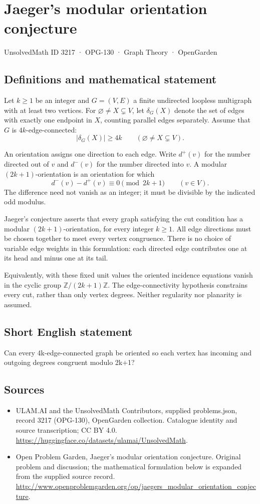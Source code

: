 \documentclass[11pt,a4paper]{article}
\begin{document}
\section*{Jaeger's modular orientation conjecture}\label{3217}
{\small UnsolvedMath ID 3217 · OPG-130 · Graph Theory · OpenGarden}
\subsection{Definitions and mathematical statement}
Let $k\geq1$ be an integer and
$G=(V,E)$ a finite undirected loopless
multigraph with at least two vertices.
For $\varnothing\neq X\subsetneq V$,
let $\delta_G(X)$ denote the set of
edges with exactly one endpoint in
$X$, counting parallel edges separately.
Assume that $G$ is $4k$-edge-connected:
\[
 |\delta_G(X)|\geq4k
 \qquad(\varnothing\neq X\subsetneq V).
\]

An orientation assigns one direction
to each edge. Write $d^+(v)$ for the
number directed out of $v$ and
$d^-(v)$ for the number directed
into $v$. A modular $(2k+1)$-orientation
is an orientation for which
\[
 d^-(v)-d^+(v)\equiv0\pmod{2k+1}
 \qquad(v\in V).
\]
The difference need not vanish as
an integer; it must be divisible
by the indicated odd modulus.

Jaeger's conjecture asserts that
every graph satisfying the cut
condition has a modular
$(2k+1)$-orientation, for every
integer $k\geq1$. All edge
directions must be chosen together
to meet every vertex congruence.
There is no choice of variable
edge weights in this formulation:
each directed edge contributes
one at its head and minus one
at its tail.

Equivalently, with these fixed
unit values the oriented incidence
equations vanish in the cyclic
group $\mathbb Z/(2k+1)\mathbb Z$.
The edge-connectivity hypothesis
constrains every cut, rather than
only vertex degrees. Neither
regularity nor planarity is assumed.
\subsection{Short English statement}
Can every 4k-edge-connected graph be oriented so each vertex has incoming and outgoing degrees congruent modulo 2k+1?
\subsection{Sources}
\begin{itemize}
\item[S1] ULAM.AI and the UnsolvedMath Contributors, supplied problems.json, record 3217 (OPG-130), OpenGarden collection. Catalogue identity and source transcription; CC BY 4.0.
\url{https://huggingface.co/datasets/ulamai/UnsolvedMath}.
\item[S2] Open Problem Garden, Jaeger's modular orientation conjecture. Original problem and discussion; the mathematical formulation below is expanded from the supplied source record.
\url{http://www.openproblemgarden.org/op/jaegers_modular_orientation_conjecture}.
\end{itemize}
\end{document}
